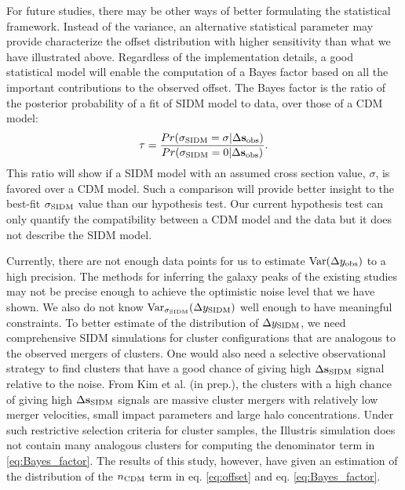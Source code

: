 For future studies, there may be other ways of better formulating the
statistical framework.
Instead of the variance, an alternative statistical parameter 
may provide characterize the offset distribution with 
higher sensitivity than what we have illustrated above.
Regardless of the implementation details,
a good statistical model will enable the computation of a Bayes factor based
on all the important contributions to the observed offset.
The Bayes factor is the ratio of the posterior probability of a fit of SIDM model to data,
over those of a CDM model:
\begin{equation}
	\tau = \frac{Pr(\sigma_{{\rm SIDM}} = \sigma | \Delta {\bf s}_{\rm
	obs})}{Pr(\sigma_{{\rm SIDM}} = 0 | \Delta {\bf s}_{\rm obs})}.
	\label{eq:Bayes_factor}
\end{equation}
This ratio will show if a SIDM model with an assumed cross section value, $\sigma$,
is favored over a CDM model. Such a comparison will provide better
insight to the best-fit $\sigma_{\rm SIDM}$ value than our hypothesis test.
Our current hypothesis test can only quantify the compatibility between a CDM
model and the data but it does not describe the SIDM model. 

Currently, there are not enough data points for us to estimate 
$\mathrm{Var}(\Delta y_{\rm obs})$ to a high precision. The methods for inferring 
the galaxy peaks of the existing studies may not be precise enough to 
achieve the optimistic noise level that we have shown. 
We also do not know $\mathrm{Var}_{\sigma_{\rm SIDM}}(\Delta y_{\rm SIDM})$ well enough
to have meaningful constraints. 
To better estimate of the distribution 
of $\Delta y_{\rm SIDM}$, we need comprehensive SIDM simulations 
for cluster configurations that are
analogous to the observed mergers of clusters. 
One would also need a selective observational strategy
to find clusters that have a good chance of giving high $\Delta {\bf s}_{\rm SIDM}$ signal
relative to the noise.  
From Kim et al. (in prep.), the clusters with a high chance of giving high
$\Delta {\bf s}_{\rm SIDM}$ signals are massive cluster mergers with relatively low merger
velocities, small impact parameters and large halo concentrations.
Under such restrictive selection criteria for cluster samples, 
the Illustris simulation does not contain 
many analogous clusters for computing the denominator term in
\ref{eq:Bayes_factor}.
The results of this study, however,
have given an estimation of the distribution of the $n_{\rm CDM}$ term in
eq. \ref{eq:offset} and eq. \ref{eq:Bayes_factor}.  

